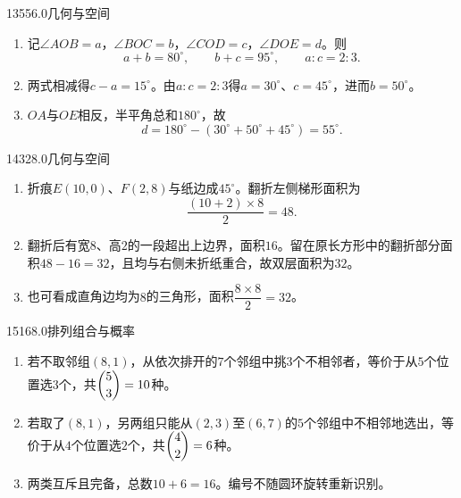 \begin{solution}{13}{55}{6.0}{几何与空间}
\begin{enumerate}[label=\textbf{Step \arabic*:},leftmargin=*]
  \item 记\(\angle AOB=a\)，\(\angle BOC=b\)，\(\angle COD=c\)，\(\angle DOE=d\)。则
  \[
    a+b=80^\circ,\qquad b+c=95^\circ,\qquad a:c=2:3.
  \]
  \item 两式相减得\(c-a=15^\circ\)。由\(a:c=2:3\)得\(a=30^\circ\)、\(c=45^\circ\)，进而\(b=50^\circ\)。
  \item \(OA\)与\(OE\)相反，半平角总和\(180^\circ\)，故
  \[
    d=180^\circ-(30^\circ+50^\circ+45^\circ)=55^\circ.
  \]
\end{enumerate}
\end{solution}

\begin{solution}{14}{32}{8.0}{几何与空间}
\begin{enumerate}[label=\textbf{Step \arabic*:},leftmargin=*]
  \item 折痕\(E(10,0)\)、\(F(2,8)\)与纸边成\(45^\circ\)。翻折左侧梯形面积为
  \[
    \frac{(10+2)\times8}{2}=48.
  \]
  \item 翻折后有宽\(8\)、高\(2\)的一段超出上边界，面积\(16\)。留在原长方形中的翻折部分面积\(48-16=32\)，且均与右侧未折纸重合，故双层面积为\(32\)。
  \item 也可看成直角边均为\(8\)的三角形，面积\(\dfrac{8\times8}{2}=32\)。
\end{enumerate}
\end{solution}

\begin{solution}{15}{16}{8.0}{排列组合与概率}
\begin{enumerate}[label=\textbf{Step \arabic*:},leftmargin=*]
  \item 若不取邻组\((8,1)\)，从依次排开的\(7\)个邻组中挑\(3\)个不相邻者，等价于从\(5\)个位置选\(3\)个，共\(\dbinom{5}{3}=10\)种。
  \item 若取了\((8,1)\)，另两组只能从\((2,3)\)至\((6,7)\)的\(5\)个邻组中不相邻地选出，等价于从\(4\)个位置选\(2\)个，共\(\dbinom{4}{2}=6\)种。
  \item 两类互斥且完备，总数\(10+6=16\)。编号不随圆环旋转重新识别。
\end{enumerate}
\end{solution}

